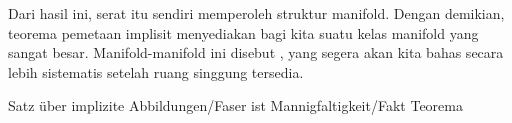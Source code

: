 Dari hasil ini, serat itu sendiri memperoleh struktur manifold. Dengan demikian, teorema pemetaan implisit menyediakan bagi kita suatu kelas manifold yang sangat besar. Manifold-manifold ini disebut  {,} yang segera akan kita bahas secara lebih sistematis setelah ruang singgung tersedia.



{Satz über implizite Abbildungen/Faser ist Mannigfaltigkeit/Fakt}
{Teorema}
{}
{

\faktzusatz {}
\faktzusatz {}

}
